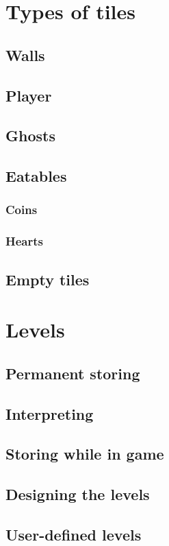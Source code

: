 \documentclass[11pt,a4paper]{report}
\begin{document}
		\section{Types of tiles}
			\subsection{Walls}
				
			\subsection{Player}
			\subsection{Ghosts}
			\subsection{Eatables}
				\subsubsection{Coins}
				\subsubsection{Hearts}
			\subsection{Empty tiles}
		\section{Levels}
			\subsection{Permanent storing}
			\subsection{Interpreting}
			\subsection{Storing while in game}
			\subsection{Designing the levels}
			\subsection{User-defined levels}
\end{document}

